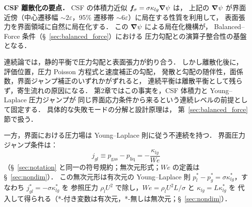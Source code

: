 \noindent\textbf{CSF 離散化の要点．}
CSF の体積力近似 $\bm{f}_\sigma = \sigma\kappa_{lg}\bm{\nabla}\psi$ は，
上記の $\bm{\nabla}\psi$ が界面近傍（中心遷移幅 $\sim 2\varepsilon$，95\% 遷移帯 $\sim 6\varepsilon$）に局在する性質を利用して，
表面張力を界面領域に自然に局在化する．
この $\bm{\nabla}\psi$ による局在化機構が，
Balanced--Force 条件（§~\ref{sec:balanced_force}）における
圧力勾配との演算子整合性の基盤となる．

\begin{tcolorbox}[defbox, title={CSF/Balanced--Force 経路へ渡す離散化上の注意}]
連続論では，静的平衡で圧力勾配と表面張力が釣り合う．
しかし離散化後に，評価位置，圧力 Poisson 方程式と速度補正の勾配，
発散と勾配の随伴性，面係数，界面ジャンプ補正のいずれかがずれると，
連続平衡は離散平衡として残らず，寄生流れの原因になる．
第2章ではこの事実を，CSF 体積力と Young--Laplace 圧力ジャンプが
同じ界面応力条件から来るという連続レベルの前提として固定する．
具体的な失敗モードの分解と設計原理は，
第~\ref{sec:balanced_force}節で扱う．
\end{tcolorbox}

一方，界面における圧力場は Young--Laplace 則に従う不連続を持つ．
界面圧力ジャンプ条件は：
\begin{equation}
  j_{gl} \equiv p_\text{gas} - p_\text{liq} = -\frac{\kappa_{lg}}{We}
  \label{eq:young_laplace_jump}
\end{equation}
（§~\ref{sec:notation} と同一の符号規約；無次元形式；$We$ の定義は §~\ref{sec:nondim}）．
この無次元形は有次元の Young--Laplace 則
$p_l^*-p_g^*=\sigma\kappa_{lg}^*$，すなわち
$j_{gl}^*=-\sigma\kappa_{lg}^*$ を
参照圧力 $\rho_l U^2$ で除し，$We = \rho_l U^2 L/\sigma$ と $\kappa_{lg} = L\kappa_{lg}^*$ を
代入して得られる（*-付き変数は有次元，*-無しは無次元；§~\ref{sec:nondim}）．

